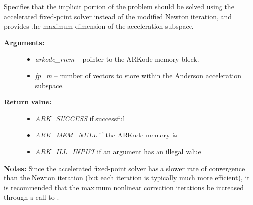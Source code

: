 \documentclass[letterpaper,10pt,english]{sphinxmanual}
\begin{document}

\begin{fulllineitems}
\label{c_interface/User_callable:c.ARKodeSetFixedPoint}
Specifies that the implicit portion of the problem should be solved
using the accelerated fixed-point solver instead of the modified
Newton iteration, and provides the maximum dimension of the
acceleration subspace.
\begin{description}
\item[{\textbf{Arguments:}}] \leavevmode\begin{itemize}
\item {} 
\emph{arkode\_mem} -- pointer to the ARKode memory block.

\item {} 
\emph{fp\_m} -- number of vectors to store within the Anderson
acceleration subspace.

\end{itemize}

\item[{\textbf{Return value:}}] \leavevmode\begin{itemize}
\item {} 
\emph{ARK\_SUCCESS} if successful

\item {} 
\emph{ARK\_MEM\_NULL} if the ARKode memory is 

\item {} 
\emph{ARK\_ILL\_INPUT} if an argument has an illegal value

\end{itemize}

\end{description}

\textbf{Notes:} Since the accelerated fixed-point solver has a slower
rate of convergence than the Newton iteration (but each iteration
is typically much more efficient), it is recommended that the
maximum nonlinear correction iterations be increased through a call
to {\hyperref[c_interface/User_callable:c.ARKodeSetMaxNonlinIters]{\emph{}}}.

\end{fulllineitems}

\end{document}
